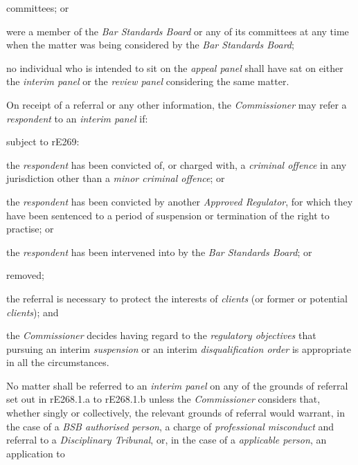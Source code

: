 committees; or\\
\item were a member of the \emph{Bar Standards Board} or any of its
committees at any time when the matter was being considered by
the \emph{Bar Standards Board};\lr\la\item no individual who is intended to sit on the \emph{appeal panel} shall
have sat on either the \emph{interim panel} or the \emph{review
panel} considering the same matter.\ln
{}\par
{}
On receipt of a referral\emph{ }or any other information,
the \emph{Commissioner} may refer a \emph{respondent} to
an \emph{interim panel} if:\\\nl \item subject to rE269:\al
\item the \emph{respondent }has been convicted of, or charged with,
a \emph{criminal offence} in any jurisdiction other than a \emph{minor
criminal offence}; or\\
\item the \emph{respondent} has been convicted by another \emph{Approved
Regulator}, for which they have been sentenced to a period of suspension
or termination of the right to practise; or\\
\item the \emph{respondent} has been intervened into by the \emph{Bar
Standards Board}; or\\
\item  removed;\\
\item the referral is necessary to protect the interests
of \emph{clients} (or former or potential \emph{clients}); and\la\item the \emph{Commissioner} decides having regard to the \emph{regulatory
objectives} that pursuing an interim \emph{suspension} or an
interim \emph{disqualification order} is appropriate in all the
circumstances.\ln
{}\par
No matter shall be referred to an \emph{interim panel}  on any of the
grounds of referral set out in rE268.1.a to rE268.1.b unless
the \emph{Commissioner} considers that, whether singly or collectively,
 the relevant grounds of referral would warrant, in the case of
a \emph{BSB authorised person}, a charge of \emph{professional
misconduct} and referral to a \emph{Disciplinary Tribunal}, or, in the
case of a \emph{applicable person}, an application to
